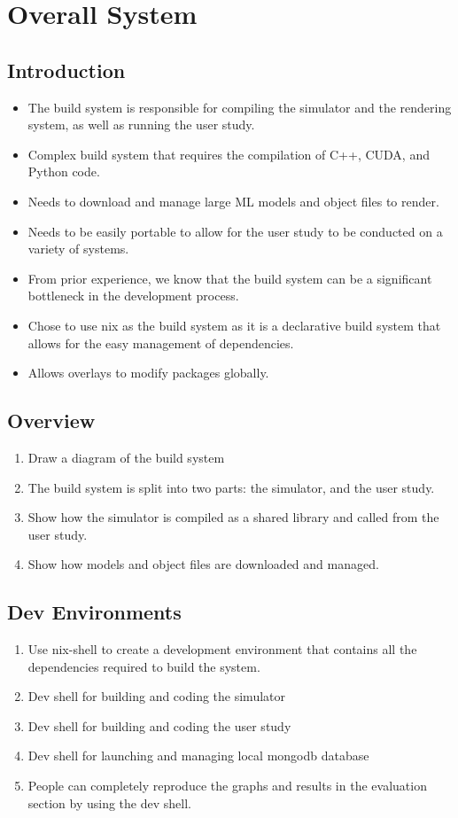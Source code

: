 \section{Overall System}

\subsection{Introduction}
\begin{itemize}
	\item The build system is responsible for compiling the simulator and the rendering system, as well as running the user study.
	\item Complex build system that requires the compilation of C++, CUDA, and Python code.
	\item Needs to download and manage large ML models and object files to render.
	\item Needs to be easily portable to allow for the user study to be conducted on a variety of systems.
	\item From prior experience, we know that the build system can be a significant bottleneck in the development process.
	\item Chose to use nix as the build system as it is a declarative build system that allows for the easy management of dependencies.
	\item Allows overlays to modify packages globally.
\end{itemize}

\subsection{Overview}
\begin{enumerate}
	\item Draw a diagram of the build system
	\item The build system is split into two parts: the simulator, and the user study.
	\item Show how the simulator is compiled as a shared library and called from the user study.
	\item Show how models and object files are downloaded and managed.
\end{enumerate}

\subsection{Dev Environments}
\begin{enumerate}
	\item Use nix-shell to create a development environment that contains all the dependencies required to build the system.
	\item Dev shell for building and coding the simulator
	\item Dev shell for building and coding the user study
	\item Dev shell for launching and managing local mongodb database
	\item People can completely reproduce the graphs and results in the evaluation section by using the dev shell.
\end{enumerate}

